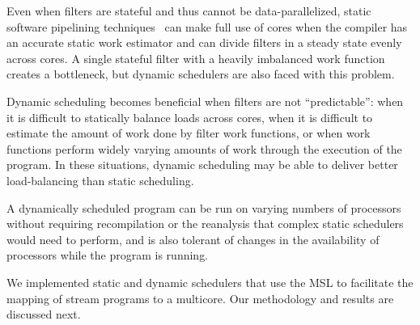 Even when filters are stateful and thus cannot be data-parallelized,
static software pipelining techniques~\cite{asplos06} can make full
use of cores when the compiler has an accurate static work estimator
and can divide filters in a steady state evenly across
cores. A single stateful filter with a heavily imbalanced work
function creates a bottleneck, but dynamic schedulers are also faced
with this problem. 

Dynamic scheduling becomes beneficial when filters are not
``predictable'': when it is difficult to statically balance loads
across cores, when it is difficult to estimate the amount of work
done by filter work functions, or when work functions perform widely
varying amounts of work through the execution of the program. In these
situations, dynamic scheduling may be able to deliver better
load-balancing than static scheduling.

A dynamically scheduled program can be run on varying numbers of
processors without requiring recompilation or the reanalysis that
complex static schedulers would need to perform, and is also tolerant
of changes in the availability of processors while the program is
running. 

We implemented static and dynamic schedulers that use the MSL to
facilitate the mapping of stream programs to a multicore. Our
methodology and results are discussed next.




